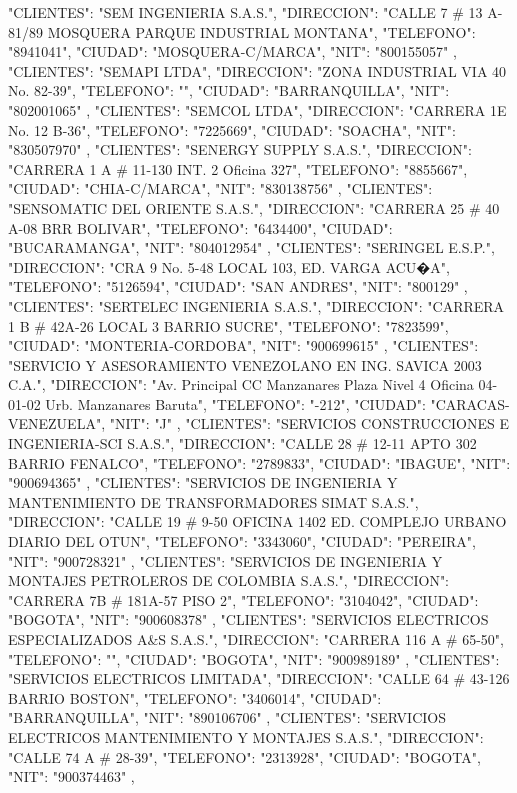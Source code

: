    {
   "CLIENTES": "SEM INGENIERIA S.A.S.",
   "DIRECCION": "CALLE 7 # 13 A-81/89 MOSQUERA PARQUE INDUSTRIAL MONTANA",
   "TELEFONO": "8941041",
   "CIUDAD": "MOSQUERA-C/MARCA",
   "NIT": "800155057"
   },
   {
   "CLIENTES": "SEMAPI LTDA",
   "DIRECCION": "ZONA INDUSTRIAL VIA 40 No. 82-39",
   "TELEFONO": "",
   "CIUDAD": "BARRANQUILLA",
   "NIT": "802001065"
   },
   {
   "CLIENTES": "SEMCOL LTDA",
   "DIRECCION": "CARRERA 1E No. 12 B-36",
   "TELEFONO": "7225669",
   "CIUDAD": "SOACHA",
   "NIT": "830507970"
   },
   {
   "CLIENTES": "SENERGY SUPPLY S.A.S.",
   "DIRECCION": "CARRERA 1 A # 11-130 INT. 2 Oficina 327",
   "TELEFONO": "8855667",
   "CIUDAD": "CHIA-C/MARCA",
   "NIT": "830138756"
   },
   {
   "CLIENTES": "SENSOMATIC DEL ORIENTE S.A.S.",
   "DIRECCION": "CARRERA 25 # 40 A-08 BRR BOLIVAR",
   "TELEFONO": "6434400",
   "CIUDAD": "BUCARAMANGA",
   "NIT": "804012954"
   },
   {
   "CLIENTES": "SERINGEL E.S.P.",
   "DIRECCION": "CRA 9 No. 5-48 LOCAL 103, ED. VARGA ACU�A",
   "TELEFONO": "5126594",
   "CIUDAD": "SAN ANDRES",
   "NIT": "800129"
   },
   {
   "CLIENTES": "SERTELEC INGENIERIA S.A.S.",
   "DIRECCION": "CARRERA 1 B # 42A-26 LOCAL 3 BARRIO SUCRE",
   "TELEFONO": "7823599",
   "CIUDAD": "MONTERIA-CORDOBA",
   "NIT": "900699615"
   },
   {
   "CLIENTES": "SERVICIO Y ASESORAMIENTO VENEZOLANO EN ING. SAVICA 2003 C.A.",
   "DIRECCION": "Av. Principal CC Manzanares Plaza Nivel 4 Oficina 04-01-02 Urb. Manzanares Baruta",
   "TELEFONO": "-212",
   "CIUDAD": "CARACAS-VENEZUELA",
   "NIT": "J"
   },
   {
   "CLIENTES": "SERVICIOS CONSTRUCCIONES E INGENIERIA-SCI S.A.S.",
   "DIRECCION": "CALLE 28 # 12-11 APTO 302 BARRIO FENALCO",
   "TELEFONO": "2789833",
   "CIUDAD": "IBAGUE",
   "NIT": "900694365"
   },
   {
   "CLIENTES": "SERVICIOS DE INGENIERIA Y MANTENIMIENTO DE TRANSFORMADORES SIMAT S.A.S.",
   "DIRECCION": "CALLE 19 # 9-50 OFICINA 1402 ED. COMPLEJO URBANO DIARIO DEL OTUN",
   "TELEFONO": "3343060",
   "CIUDAD": "PEREIRA",
   "NIT": "900728321"
   },
   {
   "CLIENTES": "SERVICIOS DE INGENIERIA Y MONTAJES PETROLEROS DE COLOMBIA S.A.S.",
   "DIRECCION": "CARRERA 7B # 181A-57 PISO 2",
   "TELEFONO": "3104042",
   "CIUDAD": "BOGOTA",
   "NIT": "900608378"
   },
   {
   "CLIENTES": "SERVICIOS ELECTRICOS ESPECIALIZADOS A&S S.A.S.",
   "DIRECCION": "CARRERA 116 A # 65-50",
   "TELEFONO": "",
   "CIUDAD": "BOGOTA",
   "NIT": "900989189"
   },
   {
   "CLIENTES": "SERVICIOS ELECTRICOS LIMITADA",
   "DIRECCION": "CALLE 64 # 43-126 BARRIO BOSTON",
   "TELEFONO": "3406014",
   "CIUDAD": "BARRANQUILLA",
   "NIT": "890106706"
   },
   {
   "CLIENTES": "SERVICIOS ELECTRICOS MANTENIMIENTO Y MONTAJES S.A.S.",
   "DIRECCION": "CALLE 74 A # 28-39",
   "TELEFONO": "2313928",
   "CIUDAD": "BOGOTA",
   "NIT": "900374463"
   },
